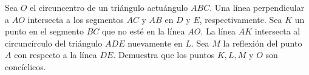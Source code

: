 Sea $O$ el circuncentro de un triángulo actuángulo $ABC$. Una línea perpendicular a $AO$ intersecta a los segmentos $AC$ y $AB$ en $D$ y $E$, respectivamente. Sea $K$ un punto en el segmento $BC$ que no esté en la línea $AO$. La línea $AK$ intersecta al circuncírculo del triángulo $ADE$ nuevamente en $L$. Sea $M$ la reflexión del punto $A$ con respecto a la línea $DE$. Demuestra que los puntos $K, L, M$ y $O$ son concíclicos.